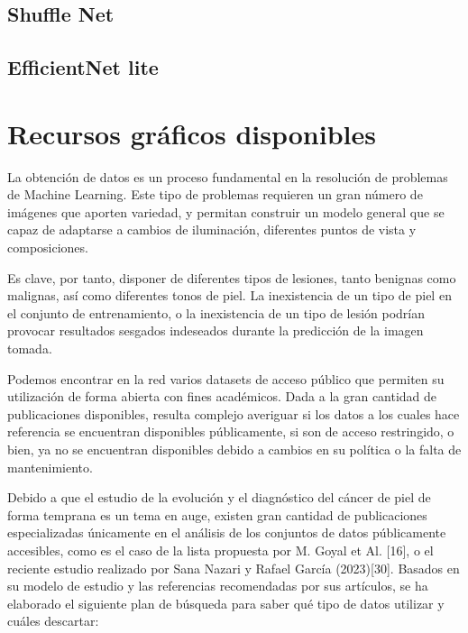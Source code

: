\subsection{Shuffle Net}

\subsection{EfficientNet lite}

\section{Recursos gráficos disponibles}

La obtención de datos es un proceso fundamental en la resolución de problemas de Machine Learning. Este tipo de problemas requieren un gran número de imágenes que aporten variedad, y permitan construir un modelo general que se capaz de adaptarse a cambios de iluminación, diferentes puntos de vista y composiciones.

Es clave, por tanto, disponer de diferentes tipos de lesiones, tanto benignas como malignas, así como diferentes tonos de piel. La inexistencia de un tipo de piel en el conjunto de entrenamiento, o la inexistencia de un tipo de lesión podrían provocar resultados sesgados indeseados durante la predicción de la imagen tomada.

Podemos encontrar en la red varios datasets de acceso público que permiten su utilización de forma abierta con fines académicos. Dada a la gran cantidad de publicaciones disponibles, resulta complejo averiguar si los datos a los cuales hace referencia se encuentran disponibles públicamente, si son de acceso restringido, o bien, ya no se encuentran disponibles debido a cambios en su política o la falta de mantenimiento.

Debido a que el estudio de la evolución y el diagnóstico del cáncer de piel de forma temprana es un tema en auge, existen gran cantidad de publicaciones especializadas únicamente en el análisis de los conjuntos de datos públicamente accesibles, como es el caso de la lista propuesta por M. Goyal et Al. [16], o el reciente estudio realizado por Sana Nazari y Rafael García (2023)[30].
Basados en su modelo de estudio y las referencias recomendadas por sus artículos, se ha elaborado el siguiente plan de búsqueda para saber qué tipo de datos utilizar y cuáles descartar:

